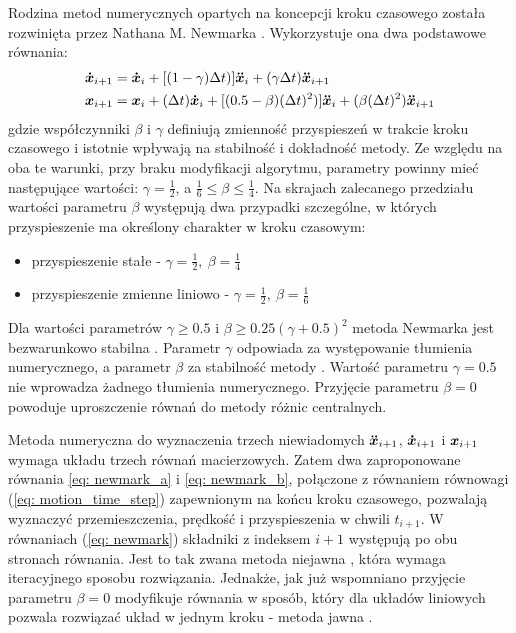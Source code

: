 Rodzina metod numerycznych opartych na koncepcji kroku czasowego została rozwinięta przez Nathana M. Newmarka \parencite{Newmark1959}. Wykorzystuje ona dwa podstawowe równania:
\begin{subequations} \label{eq: newmark}
	\begin{align}
		\bm{\dot{x}}_{i+1} &= \bm{\dot{x}}_{i} + [(1-\gamma)\Delta t)]\bm{\ddot{x}}_{i} + (\gamma\Delta t)\bm{\ddot{x}}_{i+1} 
		\label{eq: newmark_a}\\
		\bm{x}_{i+1} &= \bm{x}_{i} + (\Delta t)\bm{\dot{x}}_{i} + [(0.5-\beta)(\Delta t)^2)]\bm{\ddot{x}}_{i}+ (\beta(\Delta t)^2)\bm{\ddot{x}}_{i+1} 
		\label{eq: newmark_b}
	\end{align}
\end{subequations}
gdzie współczynniki $\beta$ i $\gamma$ definiują zmienność przyspieszeń w trakcie kroku czasowego i istotnie wpływają na stabilność i dokładność metody. Ze względu na oba te warunki, przy braku modyfikacji algorytmu, parametry powinny mieć następujące wartości: $\gamma = \frac{1}{2}$, a $ \frac{1}{6}\leq \beta \leq \frac{1}{4}$. Na skrajach zalecanego przedziału wartości parametru $\beta$ występują dwa przypadki szczególne, w których przyspieszenie ma określony charakter w kroku czasowym:
\begin{itemize}[noitemsep]
	\item przyspieszenie stałe - $\gamma = \frac{1}{2},\: \beta = \frac{1}{4}$
	\item przyspieszenie zmienne liniowo - $\gamma = \frac{1}{2},\: \beta = \frac{1}{6}$
\end{itemize}

Dla wartości parametrów $\gamma\ge 0.5$ i $\beta\ge0.25(\gamma+0.5)^2$ metoda Newmarka jest bezwarunkowo stabilna \parencite{Rakowski2016}. Parametr $\gamma$ odpowiada za występowanie tłumienia numerycznego, a parametr $\beta$ za stabilność metody \parencite{Bajer2012}. Wartość parametru $\gamma=0.5$ nie wprowadza żadnego tłumienia numerycznego. Przyjęcie parametru $\beta=0$ powoduje uproszczenie równań do metody różnic centralnych.

Metoda numeryczna do wyznaczenia trzech niewiadomych $\bm{\ddot{x}}_{i+1}$, $\bm{\dot{x}}_{i+1}$ i $\bm{x}_{i+1}$ wymaga układu trzech równań macierzowych. Zatem dwa zaproponowane równania \ref{eq: newmark_a} i \ref{eq: newmark_b}, połączone z równaniem równowagi (\ref{eq: motion_time_step}) zapewnionym na końcu kroku czasowego, pozwalają wyznaczyć przemieszczenia, prędkość i przyspieszenia w chwili $t_{i+1}$. W równaniach (\ref{eq: newmark}) składniki z indeksem $i+1$ występują po obu stronach równania. Jest to tak zwana metoda niejawna , która wymaga iteracyjnego sposobu rozwiązania. Jednakże, jak już wspomniano przyjęcie parametru $\beta=0$ modyfikuje równania w sposób, który dla układów liniowych pozwala rozwiązać układ w jednym kroku - metoda jawna . 

